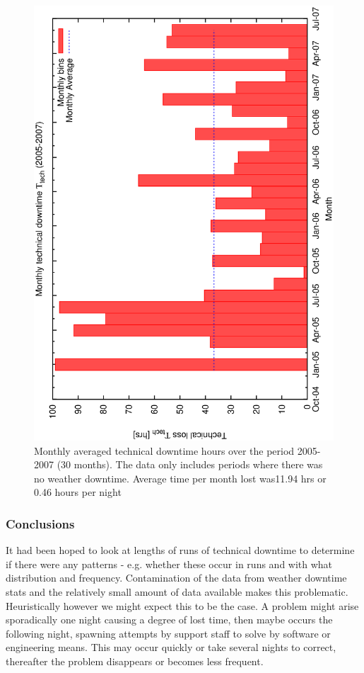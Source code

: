 \begin{figure}[htbp]
  \begin{center}
    \includegraphics[scale=0.4, angle=-90]{figures/ecs/monthly_tech_stats.eps}
  \end{center}   
  \caption[Monthly averaged technical downtime hours.]
{Monthly averaged technical downtime hours over the period 2005-2007 (30 months). The data only includes periods where there was no weather downtime. Average time per month lost was11.94 hrs or 0.46 hours per night}
  \label{fig:monthly_tech_stats}
\end{figure}


\subsubsection{Conclusions}
It had been hoped to look at lengths of runs of technical downtime to determine if there were any patterns - e.g. whether these occur in runs and with what distribution and frequency. Contamination of the data from weather downtime stats and the relatively small amount of data available makes this problematic. Heuristically however we might expect this to be the case. A problem might arise sporadically one night causing a degree of lost time, then maybe occurs the following night, spawning attempts by support staff to solve by software or engineering means. This may occur quickly or take several nights to correct, thereafter the problem disappears or becomes less frequent.

